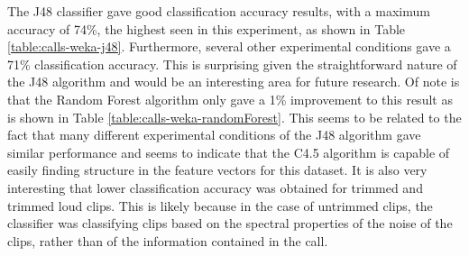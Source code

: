 \documentclass[12pt,oneside]{book}
\begin{document}
The J48 classifier gave good classification accuracy results, with a
maximum accuracy of 74\%, the highest seen in this experiment, as
shown in Table \ref{table:calls-weka-j48}.  Furthermore, several other
experimental conditions gave a 71\% classification accuracy.  This is
surprising given the straightforward nature of the J48 algorithm and
would be an interesting area for future research.  Of note is that the
Random Forest algorithm only gave a 1\% improvement to this result as
is shown in Table \ref{table:calls-weka-randomForest}.  This seems to
be related to the fact that many different experimental conditions of
the J48 algorithm gave similar performance and seems to indicate that
the C4.5 algorithm is capable of easily finding structure in the
feature vectors for this dataset.  It is also very interesting that
lower classification accuracy was obtained for trimmed and trimmed
loud clips.  This is likely because in the case of untrimmed clips,
the classifier was classifying clips based on the spectral properties
of the noise of the clips, rather than of the information contained in
the call.
\end{document}
